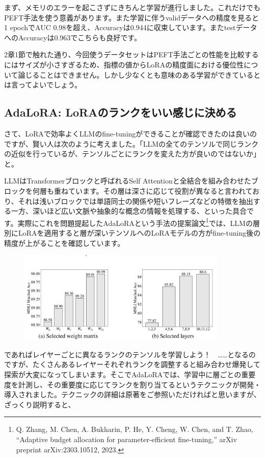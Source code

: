 \documentclass[a5paper,twoside,dvipdfmx]{jsarticle}
\begin{document}
まず、メモリのエラーを起こさずにきちんと学習が進行しました。これだけでもPEFT手法を使う意義があります。また学習に伴うvalidデータへの精度を見ると1 epochでAUC 0.98を超え、Accuracyは0.944に収束しています。またtestデータへのAccuracyは0.963でこちらも良好です。

2章1節で触れた通り、今回使うデータセットはPEFT手法ごとの性能を比較するにはサイズが小さすぎるため、指標の値からLoRAの精度面における優位性について論じることはできません。しかし少なくとも意味のある学習ができているとは言ってよいでしょう。

\subsection{AdaLoRA: LoRAのランクをいい感じに決める}

さて、LoRAで効率よくLLMのfine-tuningができることが確認できたのは良いのですが、賢い人は次のように考えました。「LLMの全てのテンソルで同じランクの近似を行っているが、テンソルごとにランクを変えた方が良いのではないか」と。

LLMはTransformerブロックと呼ばれるSelf Attentionと全結合を組み合わせたブロックを何層も重ねています。その層は深さに応じて役割が異なると言われており、それは浅いブロックでは単語同士の関係や短いフレーズなどの特徴を抽出する一方、深いほど広い文脈や抽象的な概念の情報を処理する、といった具合です。実際にこれを問題提起した\textsf{AdaLoRA}という手法の提案論文\footnote{Q. Zhang, M. Chen, A. Bukharin, P. He, Y. Cheng, W. Chen, and  T. Zhao, “Adaptive budget allocation for parameter-efficient fine-tuning,” arXiv preprint arXiv:2303.10512, 2023. }では、LLMの層別にLoRAを適用すると層が深いテンソルへのLoRAモデルの方がfine-tuning後の精度が上がることを確認しています。

\newpage

\begin{figure}[h]
  \centering
  \includegraphics[width=100mm]{../C105Fig/gray/adalora_layers.png}
 \end{figure} 

であればレイヤーごとに異なるランクのテンソルを学習しよう！　……となるのですが、たくさんあるレイヤーそれぞれランクを調整すると組み合わせ爆発して探索が大変になってしまいます。そこでAdaLoRAでは、学習中に層ごとの重要度を計測し、その重要度に応じてランクを割り当てるというテクニックが開発・導入されました。テクニックの詳細は原著をご参照いただければと思いますが、ざっくり説明すると、
\end{document}
